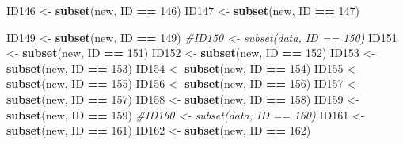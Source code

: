 \documentclass[
]{book}
\newenvironment{Shaded}{\begin{snugshade}}{\end{snugshade}}
\newcommand{\CommentTok}[1]{\textcolor[rgb]{0.56,0.35,0.01}{\textit{#1}}}
\newcommand{\DecValTok}[1]{\textcolor[rgb]{0.00,0.00,0.81}{#1}}
\newcommand{\KeywordTok}[1]{\textcolor[rgb]{0.13,0.29,0.53}{\textbf{#1}}}
\newcommand{\NormalTok}[1]{#1}
\newcommand{\OperatorTok}[1]{\textcolor[rgb]{0.81,0.36,0.00}{\textbf{#1}}}
\newcommand{\StringTok}[1]{\textcolor[rgb]{0.31,0.60,0.02}{#1}}
\begin{document}
\begin{Shaded}
\begin{Highlighting}[]
{{{{{{\NormalTok{ID146 <-}\StringTok{ }\KeywordTok{subset}\NormalTok{(new, ID }\OperatorTok{==}\StringTok{ }\DecValTok{146}\NormalTok{)}
\NormalTok{ID147 <-}\StringTok{ }\KeywordTok{subset}\NormalTok{(new, ID }\OperatorTok{==}\StringTok{ }\DecValTok{147}\NormalTok{)}

\NormalTok{ID149 <-}\StringTok{ }\KeywordTok{subset}\NormalTok{(new, ID }\OperatorTok{==}\StringTok{ }\DecValTok{149}\NormalTok{)}
\CommentTok{#ID150 <- subset(data, ID == 150)}
\NormalTok{ID151 <-}\StringTok{ }\KeywordTok{subset}\NormalTok{(new, ID }\OperatorTok{==}\StringTok{ }\DecValTok{151}\NormalTok{)}
\NormalTok{ID152 <-}\StringTok{ }\KeywordTok{subset}\NormalTok{(new, ID }\OperatorTok{==}\StringTok{ }\DecValTok{152}\NormalTok{)}
\NormalTok{ID153 <-}\StringTok{ }\KeywordTok{subset}\NormalTok{(new, ID }\OperatorTok{==}\StringTok{ }\DecValTok{153}\NormalTok{)}
\NormalTok{ID154 <-}\StringTok{ }\KeywordTok{subset}\NormalTok{(new, ID }\OperatorTok{==}\StringTok{ }\DecValTok{154}\NormalTok{)}
\NormalTok{ID155 <-}\StringTok{ }\KeywordTok{subset}\NormalTok{(new, ID }\OperatorTok{==}\StringTok{ }\DecValTok{155}\NormalTok{)}
\NormalTok{ID156 <-}\StringTok{ }\KeywordTok{subset}\NormalTok{(new, ID }\OperatorTok{==}\StringTok{ }\DecValTok{156}\NormalTok{)}
\NormalTok{ID157 <-}\StringTok{ }\KeywordTok{subset}\NormalTok{(new, ID }\OperatorTok{==}\StringTok{ }\DecValTok{157}\NormalTok{)}
\NormalTok{ID158 <-}\StringTok{ }\KeywordTok{subset}\NormalTok{(new, ID }\OperatorTok{==}\StringTok{ }\DecValTok{158}\NormalTok{)}
\NormalTok{ID159 <-}\StringTok{ }\KeywordTok{subset}\NormalTok{(new, ID }\OperatorTok{==}\StringTok{ }\DecValTok{159}\NormalTok{)}
\CommentTok{#ID160 <- subset(data, ID == 160)}
\NormalTok{ID161 <-}\StringTok{ }\KeywordTok{subset}\NormalTok{(new, ID }\OperatorTok{==}\StringTok{ }\DecValTok{161}\NormalTok{)}
\NormalTok{ID162 <-}\StringTok{ }\KeywordTok{subset}\NormalTok{(new, ID }\OperatorTok{==}\StringTok{ }\DecValTok{162}\NormalTok{)}


}}}}}}
\end{Highlighting}
\end{Shaded}
\end{document}
